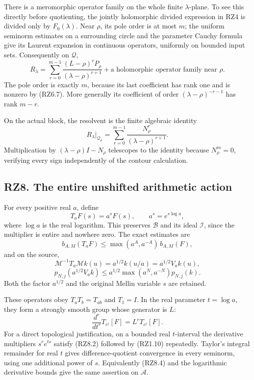 \documentclass[
]{article}
\begin{document}
There is a meromorphic operator family on the whole finite
\(\lambda\)-plane. To see this directly before quotienting, the jointly
holomorphic divided expression in RZ4 is divided only by
\(F_0(\lambda)\). Near \(\rho\), its pole order is at most \(m\); the
uniform seminorm estimates on a surrounding circle and the parameter
Cauchy formula give its Laurent expansion in continuous operators,
uniformly on bounded input sets. Consequently on \(\mathcal Q\), \[
R_\lambda=
\sum_{r=0}^{m-1}
\frac{(L-\rho)^rP_\rho}{(\lambda-\rho)^{r+1}}
+\text{a holomorphic operator family near }\rho .
\tag{RZ7.9}
\] The pole order is exactly \(m\), because its last coefficient has
rank one and is nonzero by (RZ6.7). More generally its coefficient of
order \((\lambda-\rho)^{-r-1}\) has rank \(m-r\).

On the actual block, the resolvent is the finite algebraic identity \[
R_\lambda|_{\mathcal Q_\rho}
=\sum_{r=0}^{m-1}\frac{N_\rho^r}{(\lambda-\rho)^{r+1}}.
\tag{RZ7.10}
\] Multiplication by \((\lambda-\rho)I-N_\rho\) telescopes to the
identity because \(N_\rho^m=0\), verifying every sign independently of
the contour calculation.

\subsection{RZ8. The entire unshifted arithmetic
action}\label{rz8.-the-entire-unshifted-arithmetic-action}

For every positive real \(a\), define \[
T_aF(s)=a^sF(s),\qquad a^s=e^{s\log a},
\tag{RZ8.1}
\] where \(\log a\) is the real logarithm. This preserves \(\mathcal B\)
and its ideal \(\mathcal I\), since the multiplier is entire and nowhere
zero. The exact estimates are \[
b_{A,M}(T_aF)\leq
\max(a^A,a^{-A})\,b_{A,M}(F),
\tag{RZ8.2}
\] and on the source, \[
\mathcal M^{-1}T_a\mathcal Mk(u)
=a^{1/2}k(u/a)=a^{1/2}V_ak(u),
\tag{RZ8.3}
\] \[
p_{N,j}(a^{1/2}V_ak)
\leq a^{1/2}\max(a^N,a^{-N})p_{N,j}(k).
\tag{RZ8.4}
\] Both the factor \(a^{1/2}\) and the original Mellin variable \(s\)
are retained.

These operators obey \(T_aT_b=T_{ab}\) and \(T_1=I\). In the real
parameter \(t=\log a\), they form a strongly smooth group whose
generator is \(L\): \[
\frac{d^r}{dt^r}T_{e^t}[F]=L^rT_{e^t}[F].
\tag{RZ8.5}
\] For a direct topological justification, on a bounded real
\(t\)-interval the derivative multipliers \(s^re^{ts}\) satisfy (RZ8.2)
followed by (RZ1.10) repeatedly. Taylor's integral remainder for real
\(t\) gives difference-quotient convergence in every seminorm, using one
additional power of \(s\). Equivalently (RZ8.4) and the logarithmic
derivative bounds give the same assertion on \(\mathcal A\).
\end{document}
